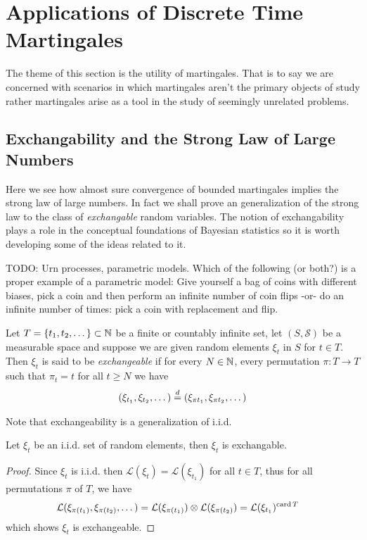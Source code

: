 \section {Applications of Discrete Time Martingales}

The theme of this section is the utility of martingales.  That is to
say we are concerned with scenarios in which martingales aren't the
primary objects of study rather martingales arise as a tool in the study of
seemingly unrelated problems.

\subsection{Exchangability and the Strong Law of Large Numbers}

Here we see how almost sure convergence of bounded martingales implies the strong law of large
numbers.  In fact we shall prove an generalization of the strong law to the class of 
\emph{exchangable} random variables.  The notion of exchangability plays a role in the
conceptual foundations of Bayesian statistics so it is worth developing some of the ideas
related to it.

TODO: Urn processes, parametric models.  Which of the following (or both?) is a proper example of a 
parametric model: Give yourself a bag of coins with different biases, pick a coin and then perform an 
infinite number of coin flips -or- do an infinite number of times: pick a coin with replacement and flip.

\begin{defn}Let $T = \lbrace t_1, t_2, \dotsc \rbrace \subset \mathbb{N}$ be a finite or countably infinite set, let $(S, \mathcal{S})$ be a measurable space and suppose we are given random elements $\xi_t$ in $S$ for $t \in T$.  Then $\xi_t$ is said to be \emph{exchangeable} if for every $N \in \mathbb{N}$, every permutation $\pi : T \to T$ such that $\pi_t = t$ for all $t \geq N$ we have
\begin{align*}
(\xi_{t_1}, \xi_{t_2}, \dotsc) \overset{d}= (\xi_{\pi t_1}, \xi_{\pi t_2}, \dotsc) 
\end{align*}
\end{defn}

Note that exchangeability is a generalization of i.i.d.
\begin{prop}Let $\xi_t$ be an i.i.d. set of random elements, then $\xi_t$ is exchangable.
\end{prop}
\begin{proof}
Since $\xi_t$ is i.i.d. then $\mathcal{L}(\xi_t)=\mathcal{L}(\xi_{t_1})$ for all $t \in T$, thus for all permutations $\pi$ of $T$, we have
\begin{align*}
\mathcal{L}(\xi_{\pi (t_1)}, \xi_{\pi( t_2)}, \dotsc) &= 
\mathcal{L}(\xi_{\pi (t_1)}) \otimes \mathcal{L}(\xi_{\pi( t_2)}) = 
\mathcal{L}(\xi_{t_1})^{\operatorname*{card}{T}}
\end{align*}
which shows $\xi_t$ is exchangeable.
\end{proof}

